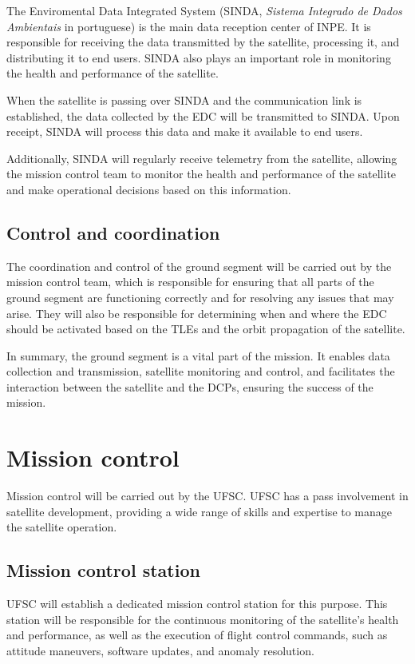 The Enviromental Data Integrated System (SINDA, \textit{Sistema Integrado de Dados Ambientais} in portuguese) is the main data reception center of INPE. It is responsible for receiving the data transmitted by the satellite, processing it, and distributing it to end users. SINDA also plays an important role in monitoring the health and performance of the satellite.

When the satellite is passing over SINDA and the communication link is established, the data collected by the EDC will be transmitted to SINDA. Upon receipt, SINDA will process this data and make it available to end users.

Additionally, SINDA will regularly receive telemetry from the satellite, allowing the mission control team to monitor the health and performance of the satellite and make operational decisions based on this information.

\subsection{Control and coordination}

The coordination and control of the ground segment will be carried out by the mission control team, which is responsible for ensuring that all parts of the ground segment are functioning correctly and for resolving any issues that may arise. They will also be responsible for determining when and where the EDC should be activated based on the TLEs and the orbit propagation of the satellite.

In summary, the ground segment is a vital part of the mission. It enables data collection and transmission, satellite monitoring and control, and facilitates the interaction between the satellite and the DCPs, ensuring the success of the mission.

\section{Mission control}

Mission control will be carried out by the UFSC. UFSC has a pass involvement in satellite development, providing a wide range of skills and expertise to manage the satellite operation.

\subsection{Mission control station}

UFSC will establish a dedicated mission control station for this purpose. This station will be responsible for the continuous monitoring of the satellite's health and performance, as well as the execution of flight control commands, such as attitude maneuvers, software updates, and anomaly resolution.

